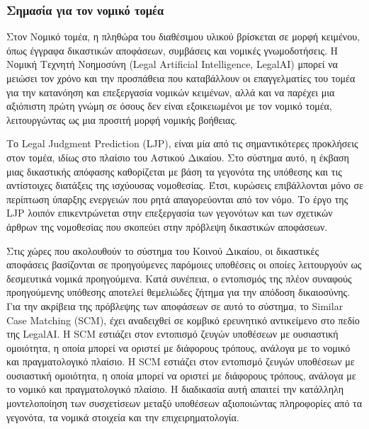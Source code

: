 \documentclass{article}
\begin{document}
\subsubsection{Σημασία για τον νομικό τομέα}
\par Στον Νομικό τομέα, η πληθώρα του διαθέσιμου υλικού βρίσκεται σε μορφή κειμένου, όπως έγγραφα δικαστικών αποφάσεων, συμβάσεις και νομικές γνωμοδοτήσεις. Η Νομική Τεχνητή Νοημοσύνη (Legal Artificial Intelligence, LegalAI) μπορεί να μειώσει τον χρόνο και την προσπάθεια που καταβάλλουν οι επαγγελματίες του τομέα για την κατανόηση και επεξεργασία νομικών κειμένων, αλλά και να παρέχει μια αξιόπιστη πρώτη γνώμη σε όσους δεν είναι εξοικειωμένοι με τον νομικό τομέα, λειτουργώντας ως μια προσιτή μορφή νομικής βοήθειας.
\par Το Legal Judgment Prediction (LJP), είναι μία από τις σημαντικότερες προκλήσεις στον τομέα, ιδίως στο πλαίσιο του Αστικού Δικαίου. Στο σύστημα αυτό, η έκβαση μιας δικαστικής απόφασης καθορίζεται με βάση τα γεγονότα της υπόθεσης και τις αντίστοιχες διατάξεις της ισχύουσας νομοθεσίας. Έτσι, κυρώσεις επιβάλλονται μόνο σε περίπτωση ύπαρξης ενεργειών που ρητά απαγορεύονται από τον νόμο. Το έργο της LJP λοιπόν επικεντρώνεται στην επεξεργασία των γεγονότων και των σχετικών άρθρων της νομοθεσίας που σκοπεύει στην πρόβλεψη δικαστικών αποφάσεων.
\par Στις χώρες που ακολουθούν το σύστημα του Κοινού Δικαίου, οι δικαστικές αποφάσεις βασίζονται σε προηγούμενες παρόμοιες υποθέσεις οι οποίες λειτουργούν ως δεσμευτικά νομικά προηγούμενα. Κατά συνέπεια, ο εντοπισμός της πλέον συναφούς προηγούμενης υπόθεσης αποτελεί θεμελιώδες ζήτημα για την απόδοση δικαιοσύνης. Για την ακρίβεια της πρόβλεψης των αποφάσεων σε αυτό το σύστημα, το Similar Case Matching (SCM), έχει αναδειχθεί σε κομβικό ερευνητικό αντικείμενο στο πεδίο της LegalAI. Η SCM εστιάζει στον εντοπισμό ζευγών υποθέσεων με ουσιαστική ομοιότητα, η οποία μπορεί να οριστεί με διάφορους τρόπους, ανάλογα με το νομικό και πραγματολογικό πλαίσιο. Η SCM εστιάζει στον εντοπισμό ζευγών υποθέσεων με ουσιαστική ομοιότητα, η οποία μπορεί να οριστεί με διάφορους τρόπους, ανάλογα με το νομικό και πραγματολογικό πλαίσιο. Η διαδικασία αυτή απαιτεί την κατάλληλη μοντελοποίηση των συσχετίσεων μεταξύ υποθέσεων αξιοποιώντας πληροφορίες από τα γεγονότα, τα νομικά στοιχεία και την επιχειρηματολογία.
\end{document}
